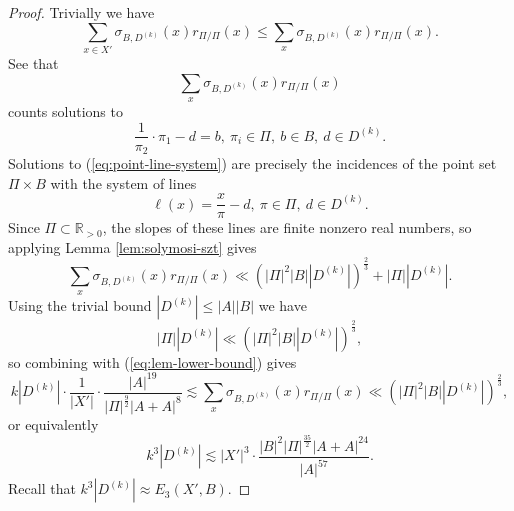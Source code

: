 \documentclass[reqno]{amsart}
\numberwithin{equation}{section}
\begin{document}
\begin{proof}
Trivially we have
\[
    \sum _{x \in X'} \sigma_{B,D^{(k)}} (x) r_{ \Pi / \Pi} (x) \leq \sum _{x} \sigma_{B,D^{(k)}} (x) r_{ \Pi / \Pi} (x)
.\]
See that
\[
    \sum _{x} \sigma_{B,D^{(k)}} (x) r_{ \Pi / \Pi} (x)
\]
counts solutions to
\begin{equation} \label{eq:point-line-system}
    \frac{1}{\pi_2} \cdot \pi_1 - d = b,~ \pi_{i} \in \Pi,~ b \in B,~ d \in D^{(k)}.
\end{equation}
Solutions to (\ref{eq:point-line-system}) are precisely the incidences of the point set
\(\Pi \times B\) with the system of lines
\[
    \ell(x) = \frac{x}{\pi} - d ,~ \pi \in \Pi ,~ d \in D^{(k)}
.\]
Since \(\Pi \subset \mathbb{R} _{>0} \), the slopes of
these lines are finite nonzero real numbers, so applying Lemma \ref{lem:solymosi-szt} gives
\[
    \sum _{x} \sigma_{B,D^{(k)}} (x) r_{ \Pi / \Pi} (x) \ll \left( \left\lvert \Pi \right\rvert ^{2} \left\lvert B \right\rvert \left\lvert D^{(k)} \right\rvert  \right) ^{\frac{2}{3} } + \left\lvert \Pi \right\rvert \left\lvert D^{(k)} \right\rvert 
.\]
Using the trivial bound \(\left\lvert D^{(k)} \right\rvert \leq  \left\lvert A \right\rvert \left\lvert B \right\rvert \) we have
\[
    \left\lvert \Pi \right\rvert \left\lvert D^{(k)} \right\rvert \ll \left( \left\lvert \Pi \right\rvert ^{2} \left\lvert B \right\rvert \left\lvert D^{(k)} \right\rvert  \right) ^{\frac{2}{3} }
,\]
so combining with (\ref{eq:lem-lower-bound}) gives
\[
    k \left\lvert D^{(k)} \right\rvert \cdot \frac{1}{\left\lvert X' \right\rvert } \cdot \frac{\left\lvert A \right\rvert ^{19}}{\left\lvert \Pi \right\rvert ^{\frac{9}{2} } \left\lvert A + A \right\rvert ^{8}} \lesssim \sum _{x} \sigma_{B,D^{(k)}} (x) r_{ \Pi / \Pi} (x) \ll \left( \left\lvert \Pi \right\rvert ^{2} \left\lvert B \right\rvert \left\lvert D^{(k)} \right\rvert  \right) ^{\frac{2}{3} }
,\]
or equivalently
\[
    k^{3}  \left\lvert D^{(k)} \right\rvert \lesssim \left\lvert X' \right\rvert ^{3} \cdot \frac{\left\lvert B \right\rvert ^{2} \left\lvert \Pi \right\rvert ^{\frac{35}{2} }\left\lvert A+A \right\rvert ^{24}}{\left\lvert A \right\rvert ^{57}} 
.\]
Recall that \(k ^{3} \left\lvert D^{(k)} \right\rvert \approx E_3(X',B)\).


\end{proof}
\end{document}

